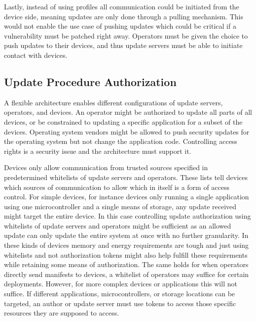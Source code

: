 \documentclass[0-thesis.tex]{subfiles}
\begin{document}
Lastly, instead of using profiles all communication could be initiated from the device
side, meaning updates are only done through a pulling mechanism. This would not enable the
use case of pushing updates which could be critical if a vulnerability must be patched
right away. Operators must be given the choice to push updates to their devices, and thus
update servers must be able to initiate contact with devices.

\subsection{Update Procedure Authorization}
\label{ssec:authorization}
A flexible architecture enables different configurations of update servers, operators, and
devices. An operator might be authorized to update all parts of all devices, or be
constrained to updating a specific application for a subset of the devices. Operating
system vendors might be allowed to push security updates for the operating system but not
change the application code. Controlling access rights is a security issue and the
architecture must support it.

Devices only allow communication from trusted sources specified in predetermined
whitelists of update servers and operators. These lists tell devices which sources of
communication to allow which in itself is a form of access control. For simple devices,
for instance devices only running a single application using one microcontroller and a
single means of storage, any update received might target the entire device. In this case
controlling update authorization using whitelists of update servers and operators might be
sufficient as an allowed update can only update the entire system at once with no further
granularity. In these kinds of devices memory and energy requirements are tough and just
using whitelists and not authorization tokens might also help fulfill these requirements
while retaining some means of authorization. The same holds for when operators directly
send manifests to devices, a whitelist of operators may suffice for certain deployments.
However, for more complex devices or applications this will not suffice. If different
applications, microcontrollers, or storage locations can be targeted, an author or update
server must use tokens to access those specific resources they are supposed to access.
\end{document}
